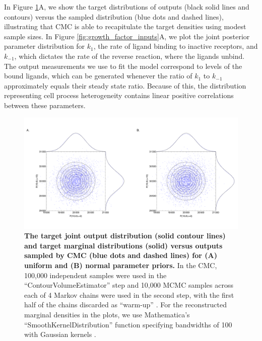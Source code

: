 \documentclass[10pt,letterpaper]{article}
\begin{document}
In Figure \ref{fig:growth_factor_outputs}A, we show the target distributions of outputs (black solid lines and contours) versus the sampled distribution (blue dots and dashed lines), illustrating that CMC is able to recapitulate the target densities using modest sample sizes. In Figure \ref{fig:growth_factor_inputs}A, we plot the joint posterior parameter distribution for $k_1$, the rate of ligand binding to inactive receptors, and $k_{-1}$, which dictates the rate of the reverse reaction, where the ligands unbind. The output measurements we use to fit the model correspond to levels of the bound ligands, which can be generated whenever the ratio of $k_1$ to $k_{-1}$ approximately equals their steady state ratio. Because of this, the distribution representing cell process heterogeneity contains linear positive correlations between these parameters.

\begin{figure}[H]
	\centerline{\includegraphics[width=\textwidth]{../figures/growth_factor_outputs.pdf}}
	\caption{\textbf{The target joint output distribution (solid contour lines) and target marginal distributions (solid) versus outputs sampled by CMC (blue dots and dashed lines) for (A) uniform and (B) normal parameter priors.} In the CMC, 100,000 independent samples were used in the ``ContourVolumeEstimator'' step and 10,000 MCMC samples across each of 4 Markov chains were used in the second step, with the first half of the chains discarded as ``warm-up'' \cite{lambert2018Student}. For the reconstructed marginal densities in the plots, we use Mathematica's ``SmoothKernelDistribution'' function specifying bandwidths of 100 with Gaussian kernels \cite{mathematica}.}
	\label{fig:growth_factor_outputs}
\end{figure}
\end{document}
